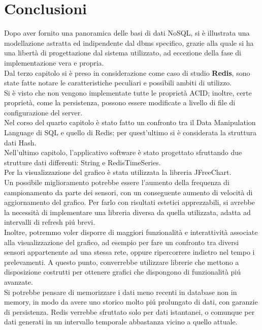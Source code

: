 \chapter{Conclusioni}
Dopo aver fornito una panoramica delle basi di dati NoSQL,
si è illustrata una modellazione astratta ed indipendente dal dbms specifico, grazie alla quale si ha una libertà
di progettazione dal sistema utilizzato, ad eccezione della fase di implementazione vera e propria.\\
Dal terzo capitolo si è preso in considerazione come caso di studio \textbf{Redis}, sono state fatte notare le caratteristiche peculiari e possibili ambiti di utilizzo.\\
Si è visto che non vengono implementate tutte le proprietà ACID; inoltre, certe proprietà, come la persistenza,
possono essere modificate a livello di file di configurazione del server.\\
Nel corso del quarto capitolo è stato fatto un confronto tra il Data Manipulation Language di SQL
e quello di Redis;
per quest'ultimo si è considerata la struttura dati Hash.\\
Nell'ultimo capitolo, l'applicativo software è stato progettato sfruttando due strutture dati differenti: String e RedisTimeSeries.\\
Per la visualizzazione del grafico è stata utilizzata la libreria JFreeChart.\\
Un possibile miglioramento potrebbe essere l'aumento della frequenza di campionamento da parte dei sensori, con un conseguente aumento di velocità di aggiornamento del grafico.
Per farlo con risultati estetici apprezzabili, si avrebbe la necessità
di implementare una libreria diversa da quella utilizzata, adatta ad intervalli di refresh piú brevi.\\
Inoltre, potremmo voler disporre di maggiori funzionalità e interattività associate alla visualizzazione del grafico, ad esempio per fare un confronto tra diversi sensori appartenente ad una stessa rete, oppure
ripercorrere indietro nel tempo i prelevamenti.
A questo punto, converrebbe utilizzare librerie che mettono a disposizione costrutti per ottenere grafici che dispongono di funzionalità piú avanzate.\\
Si potrebbe pensare di memorizzare i dati meno recenti in database non in memory, in modo da avere uno storico molto piú prolungato di dati, con garanzie di persistenza.
Redis verrebbe sfruttato solo per dati istantanei, o comunque per dati generati in un intervallo temporale abbastanza vicino a quello attuale.\\

